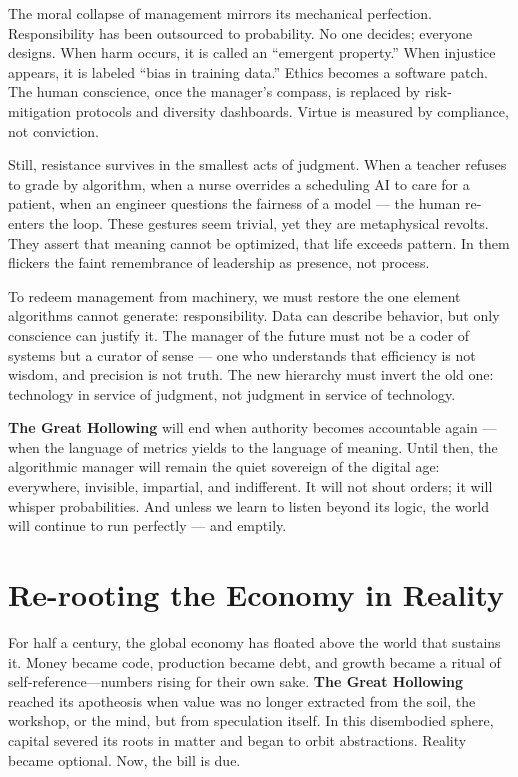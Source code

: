 \documentclass[11pt,twoside]{book}
\begin{document}
The moral collapse of management mirrors its mechanical perfection.  
Responsibility has been outsourced to probability.  
No one decides; everyone designs.  
When harm occurs, it is called an “emergent property.”  
When injustice appears, it is labeled “bias in training data.”  
Ethics becomes a software patch.  
The human conscience, once the manager’s compass, is replaced by risk-mitigation protocols and diversity dashboards.  
Virtue is measured by compliance, not conviction.

Still, resistance survives in the smallest acts of judgment.  
When a teacher refuses to grade by algorithm, when a nurse overrides a scheduling AI to care for a patient, when an engineer questions the fairness of a model — the human re-enters the loop.  
These gestures seem trivial, yet they are metaphysical revolts.  
They assert that meaning cannot be optimized, that life exceeds pattern.  
In them flickers the faint remembrance of leadership as presence, not process.

To redeem management from machinery, we must restore the one element algorithms cannot generate: responsibility.  
Data can describe behavior, but only conscience can justify it.  
The manager of the future must not be a coder of systems but a curator of sense — one who understands that efficiency is not wisdom, and precision is not truth.  
The new hierarchy must invert the old one: technology in service of judgment, not judgment in service of technology.

\textbf{The Great Hollowing} will end when authority becomes accountable again — when the language of metrics yields to the language of meaning.  
Until then, the algorithmic manager will remain the quiet sovereign of the digital age: everywhere, invisible, impartial, and indifferent.  
It will not shout orders; it will whisper probabilities.  
And unless we learn to listen beyond its logic, the world will continue to run perfectly — and emptily.

% 
\chapter{Re-rooting the Economy in Reality}
\label{ch:34}

For half a century, the global economy has floated above the world that sustains it.  
Money became code, production became debt, and growth became a ritual of self-reference—numbers rising for their own sake.  
\textbf{The Great Hollowing} reached its apotheosis when value was no longer extracted from the soil, the workshop, or the mind, but from speculation itself.  
In this disembodied sphere, capital severed its roots in matter and began to orbit abstractions.  
Reality became optional.  
Now, the bill is due.
\end{document}
